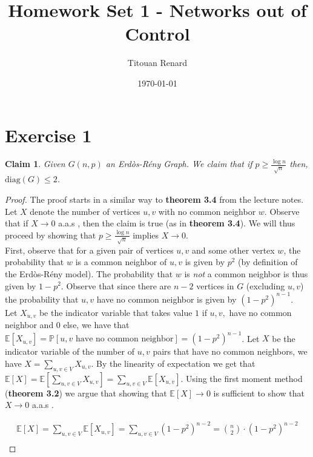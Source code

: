 \documentclass[11pt]{article}
\title{Homework Set 1 - Networks out of Control}
\date{\today}
\author{Titouan Renard}
\newtheorem{claim}{Claim}[section]
\begin{document}
\maketitle	

\section*{Exercise 1}


\begin{claim}
    Given $G(n,p)$ an Erdòs-Rény Graph. We claim that if $p\geq \frac{\log n}{\sqrt{n}}$ then, $\text{diag}(G) \leq 2$.
\end{claim}

\begin{proof}
    The proof starts in a similar way to \textbf{theorem 3.4} from the lecture notes. Let $X$ denote the number of vertices $u,v$ with no common neighbor $w$. Observe that if  $X \rightarrow 0$ a.a.s , then the claim is true (as in \textbf{theorem 3.4}). We will thus proceed by showing that $p\geq \frac{\log n}{\sqrt{n}}$ implies $X \rightarrow 0$. \\

    First, observe that for a given pair of vertices $u,v$ and some other vertex $w$, the probability that $w$ is a common neighbor of $u,v$ is given by $p^2$ (by definition of the Erdòs-Rény model). The probability that $w$ is \textit{not} a common neighbor is thus given by $1-p^2$. Observe that since there are $n-2$ vertices in $G$ (excluding $u,v$) the probability that $u,v$ have no common neighbor is given by $(1-p^2)^{n-1}$. \\
    
    Let $X_{u,v}$ be the indicator variable that takes value $1$ if $u,v,$ have no common neighbor and $0$ else, we have that $\mathbb{E}[X_{u,v}] = \mathbb{P}[u,v \text{ have no common neighbor}] = (1-p^2)^{n-1}$. Let $X$ be the indicator variable of the number of $u,v$ pairs that have no common neighbors, we have $X = \sum_{u,v \in V} X_{u,v}$. By the linearity of expectation we get that $\mathbb{E}[X] = \mathbb{E}[\sum_{u,v \in V} X_{u,v}] = \sum_{u,v \in V} \mathbb{E}[X_{u,v}]$. Using the first moment method (\textbf{theorem 3.2}) we argue that showing that $\mathbb{E}[X] \rightarrow 0$ is sufficient to show that $X\rightarrow 0$ a.a.s .

    \begin{align*}
        \mathbb{E}[X] = \sum_{u,v \in V} \mathbb{E}[X_{u,v}] = \sum_{u,v \in V} (1-p^2)^{n-2} = \binom{n}{2} \cdot (1-p^2)^{n-2}\\
    \end{align*}


\end{proof}
\end{document}
